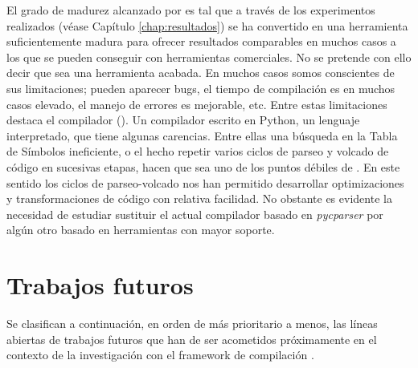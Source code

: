 El grado de madurez alcanzado por \accULL{} es tal que a través de los experimentos 
realizados (véase Capítulo \ref{chap:resultados}) \accULL{} se ha convertido en una 
herramienta suficientemente madura para ofrecer resultados comparables en muchos casos a los 
que se pueden conseguir con herramientas comerciales.
No se pretende con ello decir que \accULL{} sea una herramienta acabada. En muchos casos 
somos conscientes de sus limitaciones; pueden aparecer bugs, el tiempo de compilación es 
en muchos casos elevado, el manejo de errores es mejorable, etc.
Entre estas limitaciones destaca el compilador (\yacf{}). Un compilador escrito en Python, 
un lenguaje interpretado, que tiene algunas carencias. Entre ellas una búsqueda en la 
Tabla de Símbolos ineficiente, o el hecho repetir varios ciclos de parseo y volcado de 
código en sucesivas etapas, hacen que \yacf{} sea uno de los puntos débiles de \accULL{}. 
En este sentido los ciclos de parseo-volcado nos han permitido desarrollar optimizaciones 
y transformaciones de código con relativa facilidad. No obstante es 
evidente la necesidad de estudiar sustituir el actual compilador \yacf{} basado en 
\textit{pycparser} \cite{Bendersky:pyc:2009}
por algún otro basado en herramientas con mayor soporte.

\section{Trabajos futuros} \label{sect:trabajo}

Se clasifican a continuación, en orden de más prioritario a menos, las líneas abiertas de 
trabajos futuros que han de ser acometidos próximamente en el contexto de la 
investigación con el framework de compilación \accULL{}.

